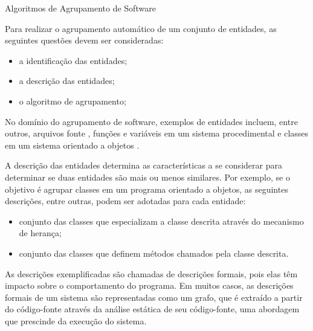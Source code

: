 \begin{section}{Algoritmos de Agrupamento de Software} \label{sec:algoritmos}

Para realizar o agrupamento automático de um conjunto de entidades, as seguintes questões devem ser consideradas:

\begin{itemize}
	\item a identificação das entidades;
	\item a descrição das entidades;
	\item o algoritmo de agrupamento;
\end{itemize}

No domínio do agrupamento de software, exemplos de entidades incluem, entre outros, arquivos fonte \cite{Mancoridis1998}, funções e variáveis em um sistema procedimental \cite{Anquetil1999} e classes em um sistema orientado a objetos \cite{Trifu2001}.

A descrição das entidades determina as características a se considerar para determinar se duas entidades são mais ou menos similares. Por exemplo, se o objetivo é agrupar classes em um programa orientado a objetos, as seguintes descrições, entre outras, podem ser adotadas para cada entidade:

\begin{itemize}
	\item conjunto das classes que especializam a classe descrita através do mecanismo de herança;
	\item conjunto das classes que definem métodos chamados pela classe descrita.
\end{itemize}

As descrições exemplificadas são chamadas de descrições formais, pois elas têm impacto sobre o comportamento do programa. Em muitos casos, as descrições formais de um sistema são representadas como um grafo, que é extraído a partir do código-fonte através da análise estática de seu código-fonte, uma abordagem que prescinde da execução do sistema.


\end{section}
